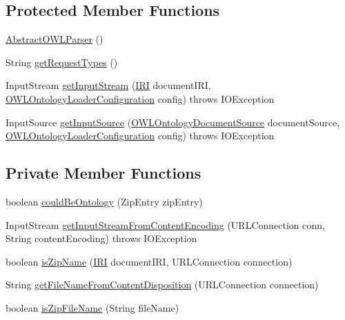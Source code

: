 \subsection*{Protected Member Functions}
\begin{DoxyCompactItemize}
\item 
\hyperlink{classorg_1_1semanticweb_1_1owlapi_1_1io_1_1_abstract_o_w_l_parser_ae87358d8c178eaf4bec3273829b1f090}{Abstract\-O\-W\-L\-Parser} ()
\item 
String \hyperlink{classorg_1_1semanticweb_1_1owlapi_1_1io_1_1_abstract_o_w_l_parser_a85b092cb9c5487bf9544bb9f29ecb999}{get\-Request\-Types} ()
\item 
Input\-Stream \hyperlink{classorg_1_1semanticweb_1_1owlapi_1_1io_1_1_abstract_o_w_l_parser_aa52fae21fb5647e56dde26cfff49d7dc}{get\-Input\-Stream} (\hyperlink{classorg_1_1semanticweb_1_1owlapi_1_1model_1_1_i_r_i}{I\-R\-I} document\-I\-R\-I, \hyperlink{classorg_1_1semanticweb_1_1owlapi_1_1model_1_1_o_w_l_ontology_loader_configuration}{O\-W\-L\-Ontology\-Loader\-Configuration} config)  throws I\-O\-Exception 
\item 
Input\-Source \hyperlink{classorg_1_1semanticweb_1_1owlapi_1_1io_1_1_abstract_o_w_l_parser_a8b2a0b0649d0f4e78643d38448281b11}{get\-Input\-Source} (\hyperlink{interfaceorg_1_1semanticweb_1_1owlapi_1_1io_1_1_o_w_l_ontology_document_source}{O\-W\-L\-Ontology\-Document\-Source} document\-Source, \hyperlink{classorg_1_1semanticweb_1_1owlapi_1_1model_1_1_o_w_l_ontology_loader_configuration}{O\-W\-L\-Ontology\-Loader\-Configuration} config)  throws I\-O\-Exception 
\end{DoxyCompactItemize}
\subsection*{Private Member Functions}
\begin{DoxyCompactItemize}
\item 
boolean \hyperlink{classorg_1_1semanticweb_1_1owlapi_1_1io_1_1_abstract_o_w_l_parser_a77a8fd5b57fea3553af5856432390566}{could\-Be\-Ontology} (Zip\-Entry zip\-Entry)
\item 
Input\-Stream \hyperlink{classorg_1_1semanticweb_1_1owlapi_1_1io_1_1_abstract_o_w_l_parser_a96518ee4a071054c81954a6b4cbef1a8}{get\-Input\-Stream\-From\-Content\-Encoding} (U\-R\-L\-Connection conn, String content\-Encoding)  throws I\-O\-Exception 
\item 
boolean \hyperlink{classorg_1_1semanticweb_1_1owlapi_1_1io_1_1_abstract_o_w_l_parser_a3b6a570d78d28d485e0e30b4e4706ae7}{is\-Zip\-Name} (\hyperlink{classorg_1_1semanticweb_1_1owlapi_1_1model_1_1_i_r_i}{I\-R\-I} document\-I\-R\-I, U\-R\-L\-Connection connection)
\item 
String \hyperlink{classorg_1_1semanticweb_1_1owlapi_1_1io_1_1_abstract_o_w_l_parser_a0be18444bd97492f437c87e5819c8cb9}{get\-File\-Name\-From\-Content\-Disposition} (U\-R\-L\-Connection connection)
\item 
boolean \hyperlink{classorg_1_1semanticweb_1_1owlapi_1_1io_1_1_abstract_o_w_l_parser_a994d654fd3f2cfc535c38b8f4d70d61b}{is\-Zip\-File\-Name} (String file\-Name)
\end{DoxyCompactItemize}
